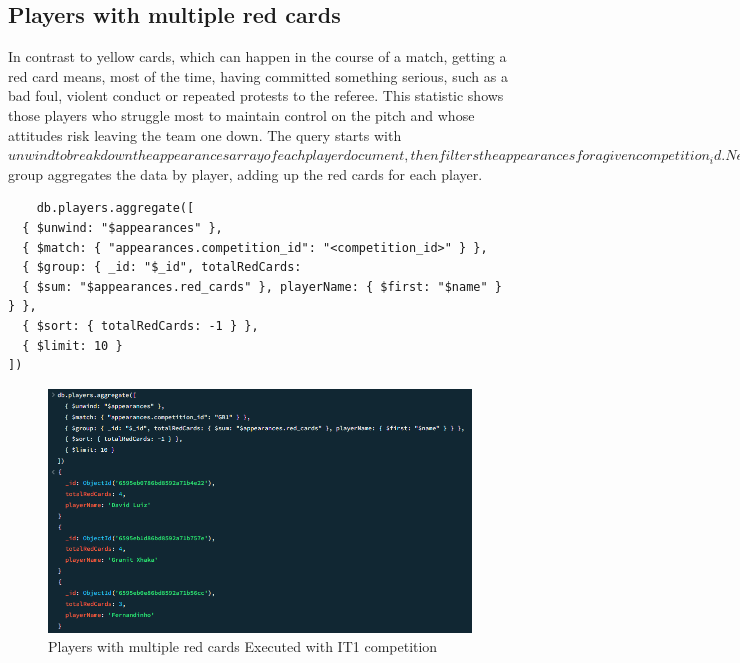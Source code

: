 \documentclass{Configuration_Files/PoliMi3i_thesis}
\begin{document}
\subsection{Players with multiple red cards}
In contrast to yellow cards, which can happen in the course of a match, getting a red card means, most of the time, having committed something serious, such as a bad foul, violent conduct or repeated protests to the referee. This statistic shows those players who struggle most to maintain control on the pitch and whose attitudes risk leaving the team one down. The query starts with $unwind to break down the appearances array of each player document, then filters the appearances for a given competition_id. Next, $group aggregates the data by player, adding up the red cards for each player. 
\begin{verbatim}
    db.players.aggregate([
  { $unwind: "$appearances" },
  { $match: { "appearances.competition_id": "<competition_id>" } },
  { $group: { _id: "$_id", totalRedCards: 
  { $sum: "$appearances.red_cards" }, playerName: { $first: "$name" } } },
  { $sort: { totalRedCards: -1 } },
  { $limit: 10 }
])
\end{verbatim}
\begin{figure}[htbp]
    \centering
    \includegraphics[scale=1]{Images/Queries/Competitions_statistics/red-cards/GB1.png}
    \caption{Players with multiple red cards Executed with IT1 competition}
\end{figure}
\end{document}
